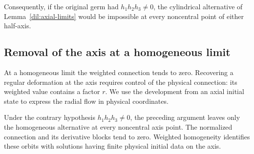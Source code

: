 \documentclass[11pt,a4paper]{article}
\numberwithin{equation}{section}
\theoremstyle{plain}
\theoremstyle{definition}
\theoremstyle{remark}
\begin{document}
Consequently, if the original germ had $h_1h_2h_3\ne0$, the cylindrical
alternative of Lemma~\ref{dil:axial-limits} would be impossible at
every noncentral point of either half-axis.

\subsection{Removal of the axis at a homogeneous limit}

At a homogeneous limit the weighted connection tends to zero.
Recovering a regular deformation at the axis requires control of
the physical connection: its weighted value contains a factor $r$.
We use the development from an axial initial state to express the
radial flow in physical coordinates.

Under the contrary hypothesis $h_1h_2h_3\ne0$, the preceding argument
leaves only the homogeneous alternative at every noncentral axis point.
The normalized connection and its derivative blocks tend to zero.
Weighted homogeneity identifies these orbits with solutions having
finite physical initial data on the axis.
\end{document}
